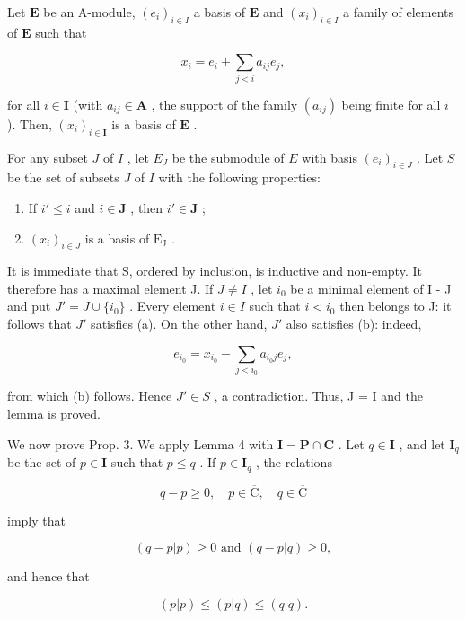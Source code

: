 Let \(\mathbf{E}\) be an A-module, \((e_i)_{i \in I}\) a basis of \(\mathbf{E}\) and \((x_i)_{i \in I}\) a family of elements of \(\mathbf{E}\) such that

\[
x _ {i} = e _ {i} + \sum_ {j <   i} a _ {i j} e _ {j},
\]

for all \(i \in \mathbf{I}\) (with \(a_{ij} \in \mathbf{A}\) , the support of the family \((a_{ij})\) being finite for all \(i\) ). Then, \((x_i)_{i \in \mathbf{I}}\) is a basis of \(\mathbf{E}\) .

For any subset \(J\) of \(I\) , let \(E_J\) be the submodule of \(E\) with basis \((e_i)_{i \in J}\) . Let \(S\) be the set of subsets \(J\) of \(I\) with the following properties:

\begin{enumerate}
\def\labelenumi{(\alph{enumi})}
\item
  If \(i' \leqslant i\) and \(i \in \mathbf{J}\) , then \(i' \in \mathbf{J}\) ;
\item
  \((x_{i})_{i\in J}\) is a basis of \(\mathrm{E_J}\) .
\end{enumerate}

It is immediate that S, ordered by inclusion, is inductive and non-empty. It therefore has a maximal element J. If \(J \neq I\) , let \(i_{0}\) be a minimal element of I - J and put \(J' = J \cup \{i_{0}\}\) . Every element \(i \in I\) such that \(i < i_{0}\) then belongs to J: it follows that \(J'\) satisfies (a). On the other hand, \(J'\) also satisfies (b): indeed,

\[
e _ {i _ {0}} = x _ {i _ {0}} - \sum_ {j <   i _ {0}} a _ {i _ {0} j} e _ {j},
\]

from which (b) follows. Hence \(J' \in S\) , a contradiction. Thus, J = I and the lemma is proved.

We now prove Prop. 3. We apply Lemma 4 with \(\mathbf{I} = \mathbf{P} \cap \overline{\mathbf{C}}\) . Let \(q \in \mathbf{I}\) , and let \(\mathbf{I}_q\) be the set of \(p \in \mathbf{I}\) such that \(p \leqslant q\) . If \(p \in \mathbf{I}_q\) , the relations

\[
q - p \geqslant 0, \quad p \in \overline {{\mathrm{C}}}, \quad q \in \overline {{\mathrm{C}}}
\]

imply that

\[
(q - p | p) \geqslant 0 \text { and } (q - p | q) \geqslant 0,
\]

and hence that

\[
(p | p) \leqslant (p | q) \leqslant (q | q).
\]


